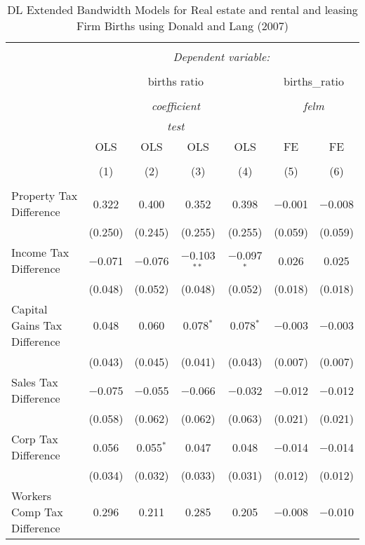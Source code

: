 
\begin{table}[!htbp] \centering 
  \caption{DL Extended Bandwidth Models for  Real estate and rental and leasing Firm Births using Donald and Lang (2007)} 
  \label{} 
\begin{tabular}{@{\extracolsep{5pt}}lcccccc} 
\\[-1.8ex]\hline 
\hline \\[-1.8ex] 
 & \multicolumn{6}{c}{\textit{Dependent variable:}} \\ 
\cline{2-7} 
\\[-1.8ex] & \multicolumn{4}{c}{births ratio} & \multicolumn{2}{c}{births\_ratio} \\ 
\\[-1.8ex] & \multicolumn{4}{c}{\textit{coefficient}} & \multicolumn{2}{c}{\textit{felm}} \\ 
 & \multicolumn{4}{c}{\textit{test}} & \multicolumn{2}{c}{\textit{}} \\ 
 & OLS & OLS & OLS & OLS & FE & FE \\ 
\\[-1.8ex] & (1) & (2) & (3) & (4) & (5) & (6)\\ 
\hline \\[-1.8ex] 
 Property Tax Difference & 0.322 & 0.400 & 0.352 & 0.398 & $-$0.001 & $-$0.008 \\ 
  & (0.250) & (0.245) & (0.255) & (0.255) & (0.059) & (0.059) \\ 
  Income Tax Difference & $-$0.071 & $-$0.076 & $-$0.103$^{**}$ & $-$0.097$^{*}$ & 0.026 & 0.025 \\ 
  & (0.048) & (0.052) & (0.048) & (0.052) & (0.018) & (0.018) \\ 
  Capital Gains Tax Difference & 0.048 & 0.060 & 0.078$^{*}$ & 0.078$^{*}$ & $-$0.003 & $-$0.003 \\ 
  & (0.043) & (0.045) & (0.041) & (0.043) & (0.007) & (0.007) \\ 
  Sales Tax Difference & $-$0.075 & $-$0.055 & $-$0.066 & $-$0.032 & $-$0.012 & $-$0.012 \\ 
  & (0.058) & (0.062) & (0.062) & (0.063) & (0.021) & (0.021) \\ 
  Corp Tax Difference & 0.056 & 0.055$^{*}$ & 0.047 & 0.048 & $-$0.014 & $-$0.014 \\ 
  & (0.034) & (0.032) & (0.033) & (0.031) & (0.012) & (0.012) \\ 
  Workers Comp Tax Difference & 0.296 & 0.211 & 0.285 & 0.205 & $-$0.008 & $-$0.010 \\ 

\end{tabular}
\end{table}
